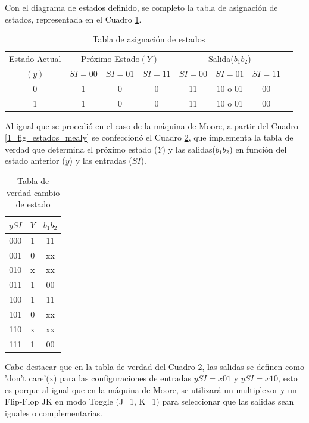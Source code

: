 \documentclass[10pt,a4paper]{article}
\begin{document}
Con el diagrama de estados definido, se completo la tabla de asignación de estados, representada en el Cuadro \ref{1_tabla_mealy_estados}.

\begin{table}[ht]
	\centering
	\begin{tabular}{c|c|c|c|c|c|c|c}
	Estado Actual & \multicolumn{3}{c|}{Próximo Estado$(Y)$} & \multicolumn{3}{c|}{Salida($b_1b_2$)}\\
	\cline{2-7}
	$(y)$ & $SI=00$ & $SI=01$ & $SI=11$ & $SI=00$ & $SI=01$ & $SI=11$ \\
	\hline
	0 & 1 & 0 & 0 & 11 & 10 o 01 & 00 \\
	1 & 1 & 0 & 0 & 11 & 10 o 01 & 00\\
	\end{tabular}
	\caption{Tabla de asignación de estados} \label{1_tabla_mealy_estados}
\end{table}

Al igual que se procedió en el caso de la máquina de Moore, a partir del Cuadro \ref{1_fig_estados_mealy} se confeccionó el Cuadro \ref{1_tabla_verdad_mealy}, que implementa la tabla de verdad que determina el próximo estado ($Y$) y las salidas($b_1b_2$) en función del estado anterior ($y$) y las entradas ($SI$). 

\begin{table}[H]
	\centering
	\begin{tabular}{c|c|c}
	$ySI$ & $Y$ & $b_1b_2$ \\ 
	\hline 
	000 & 1 & 11  \\ 
	\hline 
	001 & 0 & xx  \\ 
	\hline 
	010 & x & xx  \\ 
	\hline 
	011 & 1 & 00  \\ 
	\hline 
	100 & 1 & 11  \\ 
	\hline 
	101 & 0 & xx  \\ 
	\hline 
	110 & x & xx  \\ 
	\hline 
	111 & 1 & 00  \\ 
	\end{tabular} 
	\caption{Tabla de verdad cambio de estado} \label{1_tabla_verdad_mealy}
\end{table}

Cabe destacar que en la tabla de verdad del Cuadro \ref{1_tabla_verdad_mealy}, las salidas se definen como 'don't care'(x) para las configuraciones de entradas $ySI = x01$ y $ySI = x10$, esto es porque al igual que en la máquina de Moore, se utilizará un multiplexor y un Flip-Flop JK en modo Toggle (J=1, K=1) para seleccionar que las salidas sean iguales o complementarias.
\end{document}
